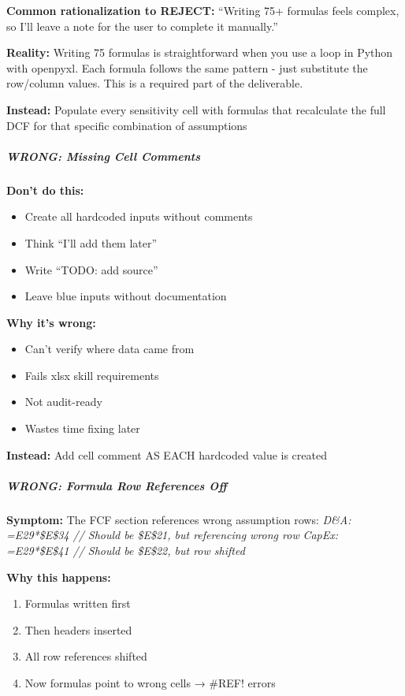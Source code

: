 \documentclass[11pt]{article}
\begin{document}
\textbf{Common rationalization to REJECT:} ``Writing 75+ formulas feels complex, so I'll leave a note for the user to complete it manually.''


\textbf{Reality:} Writing 75 formulas is straightforward when you use a loop in Python with openpyxl. Each formula follows the same pattern - just substitute the row/column values. This is a required part of the deliverable.


\textbf{Instead:} Populate every sensitivity cell with formulas that recalculate the full DCF for that specific combination of assumptions


\subparagraph{WRONG: Missing Cell Comments}\mbox{}\par

\textbf{Don't do this:}

\begin{itemize}[leftmargin=*,itemsep=2pt,topsep=2pt]
\item {} Create all hardcoded inputs without comments
\item {} Think ``I'll add them later''
\item {} Write ``TODO: add source''
\item {} Leave blue inputs without documentation
\end{itemize}

\textbf{Why it's wrong:}

\begin{itemize}[leftmargin=*,itemsep=2pt,topsep=2pt]
\item {} Can't verify where data came from
\item {} Fails xlsx skill requirements
\item {} Not audit-ready
\item {} Wastes time fixing later
\end{itemize}

\textbf{Instead:} Add cell comment AS EACH hardcoded value is created


\subparagraph{WRONG: Formula Row References Off}\mbox{}\par

\textbf{Symptom:} The FCF section references wrong assumption rows: \emph{D\&A:  =E29*\$E\$34    // Should be \$E\$21, but referencing wrong row} \emph{CapEx: =E29*\$E\$41   // Should be \$E\$22, but row shifted}


\textbf{Why this happens:}

\begin{enumerate}[leftmargin=*,itemsep=2pt,topsep=2pt]
\item {} Formulas written first
\item {} Then headers inserted
\item {} All row references shifted
\item {} Now formulas point to wrong cells → \#REF! errors
\end{enumerate}
\end{document}
